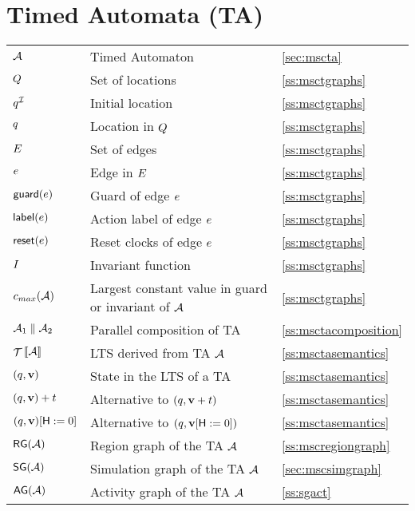 {\section*{Timed Automata (TA)}
\begin{tabular}{l>{\raggedright}p{.4\linewidth}<{}l}
$\AA$ & Timed Automaton & \ref{sec:mscta} \\
$Q$ & Set of locations & \ref{ss:msctgraphs} \\
$\tgiloc$ & Initial location & \ref{ss:msctgraphs} \\
$q$ & Location in $Q$ & \ref{ss:msctgraphs} \\
$E$ & Set of edges & \ref{ss:msctgraphs} \\
$e$ & Edge in $E$ & \ref{ss:msctgraphs} \\
$\mathop{\sf guard}(e)$ & Guard of edge $e$ & \ref{ss:msctgraphs} \\
$\mathop{\sf label}(e)$ & Action label of edge $e$ & \ref{ss:msctgraphs} \\
$\mathop{\sf reset}(e)$ & Reset clocks of edge $e$ & \ref{ss:msctgraphs} \\
$I$ & Invariant function & \ref{ss:msctgraphs} \\
$\cmax(\AA)$ & Largest constant value in guard or invariant of $\AA$ & \ref{ss:msctgraphs} \\
$\AA_1 \parallel \AA_2$ & Parallel composition of TA & \ref{ss:msctacomposition} \\
$\TSys{\AA}$ & LTS derived from TA $\AA$ & \ref{ss:msctasemantics} \\
$(q,\mathbf{v})$ & State in the LTS of a TA & \ref{ss:msctasemantics} \\
$(q,\mathbf{v}) + {t}$ &  Alternative to $(q,\mathbf{v}+{t})$ & \ref{ss:msctasemantics} \\
$(q,\mathbf{v})[{\sf H}:=0]$ & Alternative to \hfil\break $(q,\mathbf{v}[{\sf H}:=0])$ & \ref{ss:msctasemantics} \\ 
$\RG(\AA)$ & Region graph of the TA $\AA$ & \ref{ss:mscregiongraph} \\
$\SG(\AA)$ & Simulation graph of the TA $\AA$ & \ref{sec:mscsimgraph} \\
$\AG(\AA)$ & Activity graph of the TA $\AA$ & \ref{ss:sgact} \\
\end{tabular}
\vfil

}
